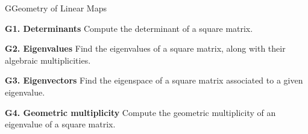 
\begin{module}{G}{Geometry of Linear Maps}

\begin{moduleStandards}
  \item \textbf{G1. Determinants}
        Compute the determinant of a square matrix.
  \item \textbf{G2. Eigenvalues}
        Find the eigenvalues of a square matrix, along with their algebraic multiplicities.
  \item \textbf{G3. Eigenvectors}
        Find the eigenspace of a square matrix associated to a given eigenvalue.
   \item \textbf{G4. Geometric multiplicity}
        Compute the geometric multiplicity of an eigenvalue of a square matrix.
\end{moduleStandards}







\end{module}
